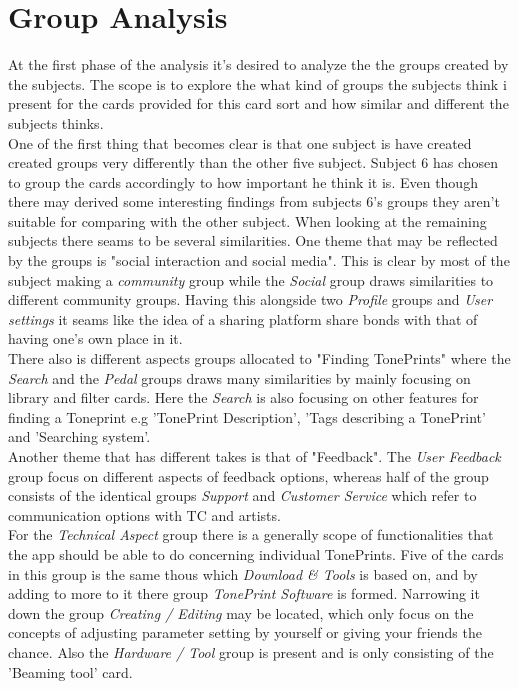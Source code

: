 \section{Group Analysis}
\label{GroupAnalysis}
%
At the first phase of the analysis it's desired to analyze the the groups created by the subjects. The scope is to explore the what kind of groups the subjects think i present for the cards provided for this card sort and how similar and different the subjects thinks.\\  
One of the first thing that becomes clear is that one subject is have created created groups very differently than the other five subject. Subject 6 has chosen to group the cards accordingly to how important he think it is. Even though there may derived some interesting findings from subjects 6's groups they aren't suitable for comparing with the other subject. When looking at the remaining subjects there seams to be several similarities. One  theme that may be reflected by the groups is "social interaction and social media". This is clear by most of the subject making a \textit{community} group while the \textit{Social} group draws similarities to different community groups. Having this alongside two \textit{Profile} groups and \textit{User settings} it seams like the idea of a sharing platform share bonds with that of having one's own place in it.  \\
There also is different aspects groups allocated to "Finding TonePrints" where the \textit{Search} and the \textit{Pedal} groups draws many similarities by mainly focusing on library and filter cards. Here the \textit{Search} is also focusing on other features for finding a Toneprint e.g 'TonePrint Description', 'Tags describing a TonePrint' and 'Searching system'.  \\
Another theme that has different takes is that of "Feedback". The \textit{User Feedback} group focus on different aspects of feedback options, whereas half of the group consists of the identical groups \textit{Support} and \textit{Customer Service} which refer to communication options with TC and artists. \\
For the \textit{Technical Aspect} group there is a generally scope of functionalities that the app should be able to do concerning individual TonePrints. Five of the cards in this group is the same thous which \textit{Download \& Tools} is based on, and by adding to more to it there group \textit{TonePrint Software} is formed. Narrowing it down the group \textit{Creating / Editing} may be located, which only focus on the concepts of adjusting parameter setting by yourself or giving your friends the chance. Also the \textit{Hardware / Tool} group is present and is only consisting of the 'Beaming tool' card.\\
